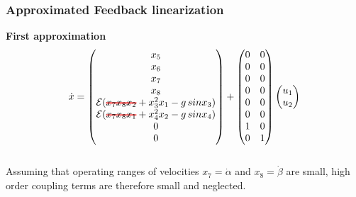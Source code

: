 \begin{frame}
\frametitle{Approximated Feedback linearization}
\textbf{First approximation}
\begin{equation}\label{eq:simplified_dynamic}
\dot{x} =%
	\begin{pmatrix}
	x_5\\
	x_6\\
	x_7\\
	x_8\\
	\mathcal{E}(\hcancel[red]{x_7x_8x_2} + x^2_3x_1 - g\,sinx_3)\\
	\mathcal{E}(\hcancel[red]{x_7x_8x_1} + x^2_4x_2 - g\,sinx_4)\\
	0\\
	0\\
	\end{pmatrix}
	+
	\begin{pmatrix}
		0 &0\\
		0 &0\\
		0 &0\\
		0 &0\\
		0 &0\\
		0 &0\\
		1 &0\\
		0 &1\\
	\end{pmatrix}
	\begin{pmatrix}
		u_1\\
	 	u_2
	\end{pmatrix}
\end{equation}\\[10pt]
Assuming that operating ranges of velocities $x_7=\dot{\alpha}$ and $x_8=\dot{\beta}$ are small, high order coupling terms are therefore small and neglected.
\end{frame}
%
